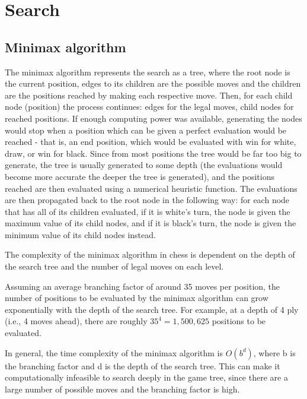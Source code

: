 \section{Search}
\label{sec:ch2sec2}

\subsection{Minimax algorithm}
\label{subsec:ch2sec2subsec1}

The minimax algorithm represents the search as a tree, where the root node is the current position, edges to its children are the possible moves and the children are the positions reached by making each respective move. Then, for each child node (position) the process continues: edges for the legal moves, child nodes for reached positions. If enough computing power was available, generating the nodes would stop when a position which can be given a perfect evaluation would be reached - that is, an end position, which would be evaluated with win for white, draw, or win for black. Since from most positions the tree would be far too big to generate, the tree is usually generated to some depth (the evaluations would become more accurate the deeper the tree is generated), and the positions reached are then evaluated using a numerical heuristic function. The evaluations are then propagated back to the root node in the following way: for each node that has all of its children evaluated, if it is white's turn, the node is given the maximum value of its child nodes, and if it is black's turn, the node is given the minimum value of its child nodes instead.\cite{klein2022neural}

The complexity of the minimax algorithm in chess is dependent on the depth of the search tree and the number of legal moves on each level.

Assuming an average branching factor of around 35 moves per position, the number of positions to be evaluated by the minimax algorithm can grow exponentially with the depth of the search tree. For example, at a depth of 4 ply (i.e., 4 moves ahead), there are roughly $35^{4} = 1,500,625$ positions to be evaluated.

In general, the time complexity of the minimax algorithm is $O(b^{d})$, where b is the branching factor and d is the depth of the search tree. This can make it computationally infeasible to search deeply in the game tree, since there are a large number of possible moves and the branching factor is high.


